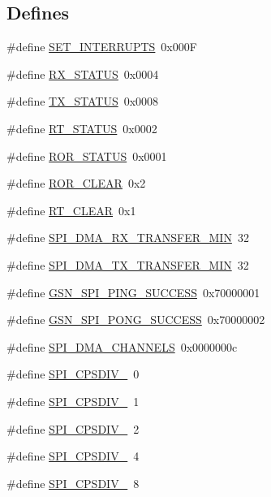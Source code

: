 \subsection*{Defines}
\begin{DoxyCompactItemize}
\item 
\#define \hyperlink{a00587_a0710240ccdbef200879fbec6fde50342}{SET\_\-INTERRUPTS}~0x000F
\item 
\#define \hyperlink{a00587_a731d30ee0b5f9f0471fa8e742ef1784c}{RX\_\-STATUS}~0x0004
\item 
\#define \hyperlink{a00587_a7575bf922b1b02fa694d964bb94e1a29}{TX\_\-STATUS}~0x0008
\item 
\#define \hyperlink{a00587_a202d8710d0c6930b5c266948f5712d7a}{RT\_\-STATUS}~0x0002
\item 
\#define \hyperlink{a00587_a2b4dc619ceaead61fe74bbcf490dc15b}{ROR\_\-STATUS}~0x0001
\item 
\#define \hyperlink{a00587_a24c449323e2955bc782cdf3b34de1e33}{ROR\_\-CLEAR}~0x2
\item 
\#define \hyperlink{a00587_aa4b1a0a251c6fac18230a25d8d89388c}{RT\_\-CLEAR}~0x1
\item 
\#define \hyperlink{a00587_ab6ee6c121b3e29bdf8de48aa17a6d296}{SPI\_\-DMA\_\-RX\_\-TRANSFER\_\-MIN}~32
\item 
\#define \hyperlink{a00587_af333ca2812c6cbcfd6637a20fa69088b}{SPI\_\-DMA\_\-TX\_\-TRANSFER\_\-MIN}~32
\item 
\#define \hyperlink{a00587_a7bb4731e0835beb3f63c02ce467e43a8}{GSN\_\-SPI\_\-PING\_\-SUCCESS}~0x70000001
\item 
\#define \hyperlink{a00587_afb6d18ccbf76c5a9ab4a6a4c50a397bc}{GSN\_\-SPI\_\-PONG\_\-SUCCESS}~0x70000002
\item 
\#define \hyperlink{a00587_acc862b4e66ca1cd03299556793dc5be3}{SPI\_\-DMA\_\-CHANNELS}~0x0000000c
\item 
\#define \hyperlink{a00587_a8d0e49a864453c0acecdd4078256442b}{SPI\_\-CPSDIV\_}~0
\item 
\#define \hyperlink{a00587_a4ac75189ac4f7b124d9b86a73a1cdcd5}{SPI\_\-CPSDIV\_}~1
\item 
\#define \hyperlink{a00587_ac09f298bf1f117b25b0683eb26d92757}{SPI\_\-CPSDIV\_}~2
\item 
\#define \hyperlink{a00587_a188625c01c63c22c4da5761f1bc2aa9d}{SPI\_\-CPSDIV\_}~4
\item 
\#define \hyperlink{a00587_aed030fb6acbafc2b27a6f43d1af24924}{SPI\_\-CPSDIV\_}~8
\item 

\end{DoxyCompactItemize}
